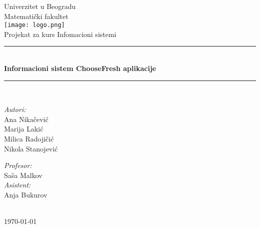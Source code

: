 \begin{titlepage}


\newcommand{\HRule}{\rule{\linewidth}{0.5mm}}
\center
\textup{\Large Univerzitet u Beogradu\\Matemati\v cki fakultet}\\[1.5cm]
\texttt{[image: logo.png]}\\[1cm]
\textup{\Large Projekat za kurs Infomacioni sistemi}\\[0.4cm]

\HRule \\[0.4cm]
{ \huge \bfseries Informacioni sistem ChooseFresh aplikacije}\\[0.4cm]
\HRule \\[4.5cm]

\begin{minipage}{0.4\textwidth}
\begin{flushleft}
\large
\emph{Autori:}\\
\textup Ana Nikačević\\
\textup Marija Lakić\\
\textup Milica Radojičić\\
\textup Nikola Stanojević\\

\end{flushleft}
\end{minipage}
\hfill
\begin{minipage}{0.4\textwidth}
\begin{flushright}
\large
\emph{Profesor:} \\
\textup Saša Malkov\\
\emph{Asistent:} \\
\textup Anja Bukurov\\
\end{flushright}
\end{minipage}\\[2cm]

{\textup \large \today}\\[1cm]

\end{titlepage}
